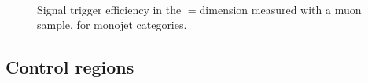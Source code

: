 \begin{figure}[h!]
  \begin{center}
     \\
    \caption{Signal trigger efficiency in the \mht$=$\scalht dimension measured with a muon sample, for monojet categories.}
    \label{fig:alphat_turnons_mono}
  \end{center}
\end{figure}




\subsection{Control regions\label{sec:control_samples}}




